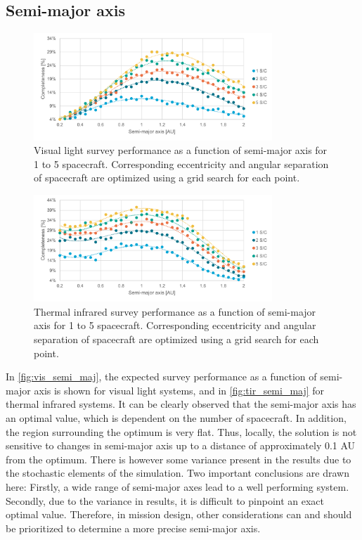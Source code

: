 \subsection{Semi-major axis}

\begin{figure}[htbp]
 \centering
 \includegraphics[width=0.8\textwidth]{img/vis_semi_maj.pdf}
 \caption{Visual light survey performance as a function of semi-major axis for 1 to 5 spacecraft. Corresponding eccentricity and angular separation of spacecraft are optimized using a grid search for each point.}
 \label{fig:vis_semi_maj}
\end{figure}

\begin{figure}[htbp]
 \centering
 \includegraphics[width=0.8\textwidth]{img/tir_semi_maj.pdf}
 \caption{Thermal infrared survey performance as a function of semi-major axis for 1 to 5 spacecraft. Corresponding eccentricity and angular separation of spacecraft are optimized using a grid search for each point.}
 \label{fig:tir_semi_maj}
\end{figure}

In \autoref{fig:vis_semi_maj}, the expected survey performance as a function of semi-major axis is shown for visual light systems, and in \autoref{fig:tir_semi_maj} for thermal infrared systems. It can be clearly observed that the semi-major axis has an optimal value, which is dependent on the number of spacecraft. In addition, the region surrounding the optimum is very flat. Thus, locally, the solution is not sensitive to changes in semi-major axis up to a distance of approximately 0.1 AU from the optimum. There is however some variance present in the results due to the stochastic elements of the simulation. Two important conclusions are drawn here: Firstly, a wide range of semi-major axes lead to a well performing system. Secondly, due to the variance in results, it is difficult to pinpoint an exact optimal value. Therefore, in mission design, other considerations can and should be prioritized to determine a more precise semi-major axis. \\

